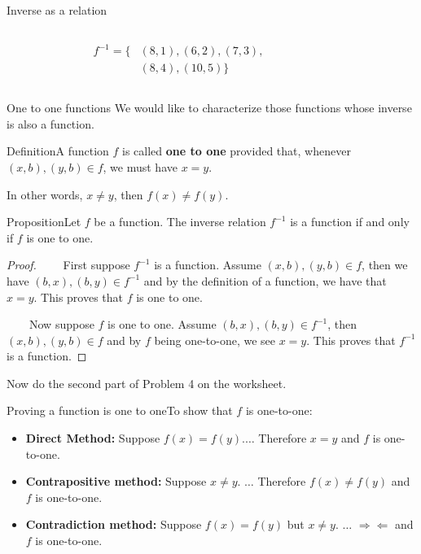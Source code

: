 \documentclass{beamer}
\def\bl[#1]#2{\begin{block}{#1}#2\end{block}}
\def\itemb{\begin{itemize}}
\def\iteme{\end{itemize}}
\begin{document}
\begin{frame}{Inverse as a relation}
\begin{columns}
\begin{figure}
\end{figure}\vspace{-0.5cm}
\begin{align*}
f^{-1}=\{&(8,1), (6,2), (7,3),\\
& (8,4), (10,5)\}
\end{align*}
\end{columns}
\end{frame}

\begin{frame}{One to one functions}
We would like to characterize those functions whose inverse is also a function.
\bl[Definition]{A function $f$ is called \textbf{one to one} provided that, whenever $(x,b), (y,b)\in f$, we must have $x=y$.}
 In other words, $x\neq y$, then $f(x)\neq f(y)$.
 
\end{frame}

\begin{frame}
\bl[Proposition]{Let $f$ be a function. The inverse relation $f^{-1}$ is a function if and only if $f$ is one to one.}
\begin{proof}
~~~~First suppose $f^{-1}$ is a function. Assume $(x,b),(y,b)\in f$, then we have $(b,x),(b,y)\in f^{-1}$ and by the definition of a function, we have that $x=y$. This proves that $f$ is one to one.

~~~~Now suppose $f$ is one to one. Assume $(b,x),(b,y)\in f^{-1}$, then $(x,b), (y,b)\in f$ and by $f$ being one-to-one, we see $x=y$. This proves that $f^{-1}$ is a function.
\end{proof}
\center Now do the second part of Problem 4 on the worksheet.
\end{frame}

\begin{frame}
\bl[Proving a function is one to one]{To show that $f$ is one-to-one:
\itemb
\item \textbf{Direct Method:} Suppose $f(x)=f(y)$.$\dots$ Therefore $x=y$ and $f$ is one-to-one.
\item \textbf{Contrapositive method:} Suppose $x\neq y$. $\dots$ Therefore $f(x)\neq f(y)$ and $f$ is one-to-one.
\item \textbf{Contradiction method:} Suppose $f(x)=f(y)$ but $x\neq y$. $\dots$ $\Rightarrow\Leftarrow$ and $f$ is one-to-one.
\iteme}
\end{frame}
\end{document}
